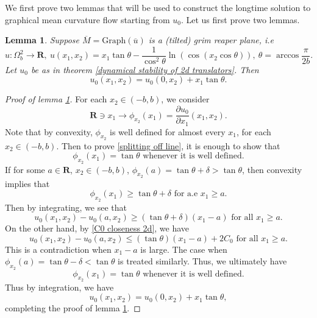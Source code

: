 \documentclass[pdflatex,sn-mathphys-num]{sn-jnl}%
\newtheorem{lemma}[theorem]{Lemma}
\begin{document}
We first prove two lemmas that will be used to construct the longtime solution to graphical mean curvature flow starting from $u_0$. Let us first prove two lemmas.
\begin{lemma}\label{splitting off of intial data}
 Suppose $\overline{M} = \text{Graph}(\overline{u})$ is a (tilted) grim reaper plane, i.e
\begin{equation}\label{tilted grim reaper}
    u : \Omega^2_b \to \mathbf{R}, \ u(x_1,x_2) = x_1\tan\theta - \frac{1}{\cos^2\theta}\ln(\cos(x_2\cos\theta) ), \ \theta = \arccos\frac{\pi}{2b}.
\end{equation}
Let $u_0$ be as in theorem \ref{dynamical stability of 2d translators}. Then
\begin{equation}\label{splitting off line}
    u_0(x_1,x_2) = u_0(0, x_2) + x_1\tan\theta.
\end{equation}
\end{lemma}
\begin{proof}[Proof of lemma \ref{splitting off of intial data}]
For each $x_2 \in (-b, b)$, we consider
\begin{equation}
    \mathbf{R}\ni x_1 \to \phi_{x_2}(x_1) = \frac{\partial u_0}{\partial x_1}(x_1,x_2).
\end{equation}
Note that by convexity, $\phi_{x_2}$ is well defined for almost every $x_1$, for each $x_2 \in (-b,b)$. Then to prove \eqref{splitting off line}, it is enough to show that 
\begin{equation}
    \phi_{x_2}(x_1) = \tan \theta \text{ whenever it is well defined}.
\end{equation}
If for some $a \in \mathbf{R}$, $x_2 \in (-b,b)$, $\phi_{x_2}(a) = \tan \theta + \delta >  \tan\theta$, then convexity implies that 
\begin{equation}
    \phi_{x_2}(x_1) \geq \tan\theta + \delta \text{ for a.e }x_1 \geq a.
\end{equation}
Then by integrating, we see that
\begin{equation}
    u_0(x_1,x_2) - u_0(a, x_2) \geq (\tan \theta + \delta)(x_1 - a) \text{ for all }x_1 \geq a.
\end{equation}
On the other hand, by \eqref{C0 closeness 2d}, we have
\begin{equation}
    u_0(x_1,x_2) - u_0(a, x_2) \leq (\tan \theta )(x_1 - a) + 2C_0 \text{ for all }x_1 \geq a.
\end{equation}
This is a contradiction when $x_1 - a$ is large. The case when $\phi_{x_2}(a) = \tan \theta - \delta < \tan\theta$ is treated similarly. Thus, we ultimately have 
\begin{equation}
 \phi_{x_2}(x_1) = \tan \theta \text{ whenever it is well defined}. 
\end{equation}
Thus by integration, we have
\begin{equation}
    u_0(x_1,x_2) = u_0(0, x_2) + x_1\tan\theta,
\end{equation}
completing the proof of lemma \ref{splitting off of intial data}.
\end{proof}
\end{document}
